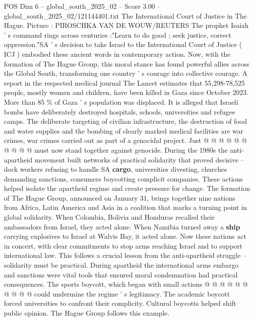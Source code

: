 \begin{textsample}{POS Dim 6 – global\_south\_2025\_02 – Score 3.00 – global\_south\_2025\_02/121144401.txt}  \label{ex:f6_pos_402}
The International Court of Justice in The Hague.
Picture : PIROSCHKA VAN DE WOUW/REUTERS The prophet Isaiah ' s command rings across centuries :"Learn to do good ; seek justice, correct oppression."SA ' s decision to take Israel to the International Court of Justice ( ICJ ) embodied these ancient words in contemporary action.
Now, with the formation of The Hague Group, this moral stance has found powerful allies across the Global South, transforming one country ' s courage into collective courage.
A report in the respected medical journal The Lancet estimates that 55,298-78,525 people, mostly women and children, have been killed in Gaza since October 2023.
More than 85 \% of Gaza ' s population was displaced.
It is alleged that Israeli bombs have deliberately destroyed hospitals, schools, universities and refugee camps.
The deliberate targeting of civilian infrastructure, the destruction of food and water supplies and the bombing of clearly marked medical facilities are war crimes, war crimes carried out as part of a genocidal project.
Just @ @ @ @ @ @ @ @ @ @ must now stand together against genocide.
During the 1980s the anti-apartheid movement built networks of practical solidarity that proved decisive -- dock workers refusing to handle SA \textbf{cargo}, universities divesting, churches demanding sanctions, consumers boycotting complicit companies.
These actions helped isolate the apartheid regime and create pressure for change.
The formation of The Hague Group, announced on January 31, brings together nine nations from Africa, Latin America and Asia in a coalition that marks a turning point in global solidarity.
When Colombia, Bolivia and Honduras recalled their ambassadors from Israel, they acted alone.
When Namibia turned away a \textbf{ship} carrying explosives to Israel at Walvis Bay, it acted alone.
Now these nations act in concert, with clear commitments to stop arms reaching Israel and to support international law.
This follows a crucial lesson from the anti-apartheid struggle -- solidarity must be practical.
During apartheid the international arms embargo and sanctions were vital tools that ensured moral condemnation had practical consequences.
The sports boycott, which began with small actions @ @ @ @ @ @ @ @ @ @ could undermine the regime ' s legitimacy.
The academic boycott forced universities to confront their complicity.
Cultural boycotts helped shift public opinion.
The Hague Group follows this example.

\end{textsample}
